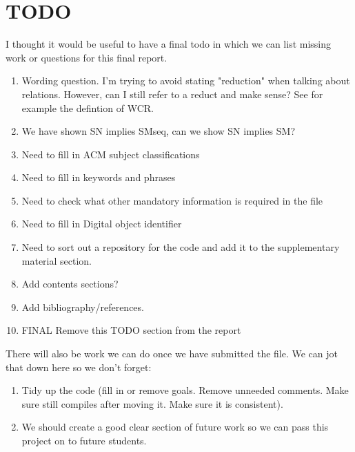 \section{TODO}

I thought it would be useful to have a final todo in which we can list missing work or questions for this final report.

\begin{enumerate}
    \item Wording question. I'm trying to avoid stating "reduction" when talking about relations. However, can I still refer to a reduct and make sense? See for example the defintion of WCR.
    \item We have shown SN implies SMseq, can we show SN implies SM?
    \item Need to fill in ACM subject classifications
    \item Need to fill in keywords and phrases
    \item Need to check what other mandatory information is required in the file 
    \item Need to fill in Digital object identifier 
    \item Need to sort out a repository for the code and add it to the supplementary material section.  
    \item Add contents sections?
    \item Add bibliography/references.
    \item FINAL Remove this TODO section from the report 
\end{enumerate}

There will also be work we can do once we have submitted the file. We can jot that down here so we don't forget:

\begin{enumerate}
    \item Tidy up the code (fill in or remove goals. Remove unneeded comments. Make sure still compiles after moving it. Make sure it is consistent).
    \item We should create a good clear section of future work so we can pass this project on to future students.
\end{enumerate}